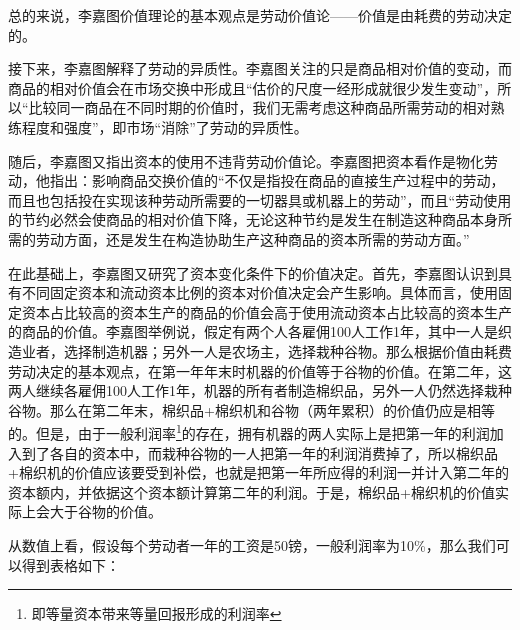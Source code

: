 总的来说，李嘉图价值理论的基本观点是劳动价值论——价值是由耗费的劳动决定的\cite[142]{CaiJiMingCongGuDianZhengZhiJingJiXueDaoZhongGuoTeSeSheHuiZhuYiZhengZhiJingJiXueJiYuZhongGuoShiJiaoDeZhengZhiJingJiXueYanBianShangCe2023}。

接下来，李嘉图解释了劳动的异质性。李嘉图关注的只是商品相对价值的变动，而商品的相对价值会在市场交换中形成且“估价的尺度一经形成就很少发生变动”，所以“比较同一商品在不同时期的价值时，我们无需考虑这种商品所需劳动的相对熟练程度和强度”\cite[13-14]{DaWei*LiJiaTuZhengZhiJingJiXueJiFuShuiYuanLi2021}，即市场“消除”了劳动的异质性。

随后，李嘉图又指出资本的使用不违背劳动价值论。李嘉图把资本看作是物化劳动，他指出：影响商品交换价值的“不仅是指投在商品的直接生产过程中的劳动，而且也包括投在实现该种劳动所需要的一切器具或机器上的劳动”\cite[17]{DaWei*LiJiaTuZhengZhiJingJiXueJiFuShuiYuanLi2021}，而且“劳动使用的节约必然会使商品的相对价值下降，无论这种节约是发生在制造这种商品本身所需的劳动方面，还是发生在构造协助生产这种商品的资本所需的劳动方面。”\cite[18]{DaWei*LiJiaTuZhengZhiJingJiXueJiFuShuiYuanLi2021}

在此基础上，李嘉图又研究了资本变化条件下的价值决定。首先，李嘉图认识到具有不同固定资本和流动资本比例的资本对价值决定会产生影响。具体而言，使用固定资本占比较高的资本生产的商品的价值会高于使用流动资本占比较高的资本生产的商品的价值。李嘉图举例说，假定有两个人各雇佣100人工作1年，其中一人是织造业者，选择制造机器；另外一人是农场主，选择栽种谷物。那么根据价值由耗费劳动决定的基本观点，在第一年年末时机器的价值等于谷物的价值。在第二年，这两人继续各雇佣100人工作1年，机器的所有者制造棉织品，另外一人仍然选择栽种谷物。那么在第二年末，棉织品+棉织机和谷物（两年累积）的价值仍应是相等的。但是，由于一般利润率\footnote{即等量资本带来等量回报形成的利润率}的存在，拥有机器的两人实际上是把第一年的利润加入到了各自的资本中，而栽种谷物的一人把第一年的利润消费掉了，所以棉织品+棉织机的价值应该要受到补偿，也就是把第一年所应得的利润一并计入第二年的资本额内，并依据这个资本额计算第二年的利润。于是，棉织品+棉织机的价值实际上会大于谷物的价值\cite[24-25]{DaWei*LiJiaTuZhengZhiJingJiXueJiFuShuiYuanLi2021}\cite[119]{YanZhiJieXiFangJingJiXueShuoShiJiaoChengDiErBan2013}。

从数值上看，假设每个劳动者一年的工资是50镑，一般利润率为10\%，那么我们可以得到表格如下\cite[19]{LiRenJunJieZhiLiLun2004}：

